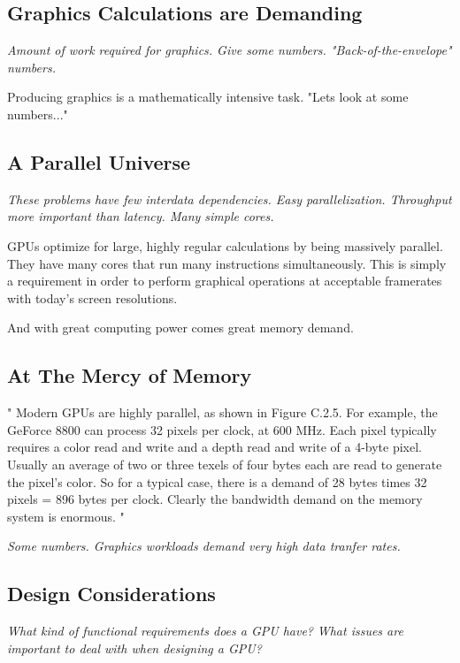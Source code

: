 \documentclass[../main/report.tex]{subfiles}
\begin{document}
\subsection{Graphics Calculations are Demanding}

\textit{Amount of work required for graphics. Give some numbers. "Back-of-the-envelope" numbers.}

Producing graphics is a mathematically intensive task.
"Lets look at some numbers..."

\subsection{A Parallel Universe}

\textit{These problems have few interdata dependencies.
Easy parallelization. Throughput more important than latency. Many simple cores.}

GPUs optimize for large, highly regular calculations by being massively parallel.
They have many cores that run many instructions simultaneously.
This is simply a requirement in order to perform graphical operations at acceptable framerates with today's screen resolutions.


And with great computing power comes great memory demand.

\subsection{At The Mercy of Memory}
"
Modern GPUs are highly parallel, as shown in Figure C.2.5. For example, the GeForce 8800 can process 32 pixels per clock, at 600 MHz. Each pixel typically requires a color read and write and a depth read and write of a 4-byte pixel. Usually an average of two or three texels of four bytes each are read to generate the pixel’s color. So for a typical case, there is a demand of 28 bytes times 32 pixels = 896 bytes per clock. Clearly the bandwidth demand on the memory system is enormous.
"

\textit{Some numbers. Graphics workloads demand very high data tranfer rates.}

\subsection{Design Considerations}

\textit{What kind of functional requirements does a GPU have?}
\textit{What issues are important to deal with when designing a GPU?}
\end{document}
